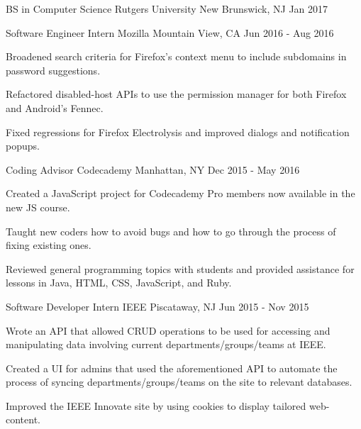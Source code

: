 \documentclass[11pt, a4paper]{awesome-cv}
\begin{document}
\makecvheader

\begin{cventries}
  \cventry
    {BS in Computer Science}
    {Rutgers University}
    {New Brunswick, NJ}
    {Jan 2017}
    {}
\end{cventries}

\vspace{-2mm}

\begin{cventries}
  \cventry
    {Software Engineer Intern}
    {Mozilla}
    {Mountain View, CA}
    {Jun 2016 - Aug 2016}
    {
      \begin{cvitems}
        \item {Broadened search criteria for Firefox’s context menu to include subdomains in password suggestions.}
        \item {Refactored disabled-host APIs to use the permission manager for both Firefox and Android’s Fennec.}
        \item {Fixed regressions for Firefox Electrolysis and improved dialogs and notification popups.}
      \end{cvitems}
    }
  \cventry
    {Coding Advisor}
    {Codecademy}
    {Manhattan, NY}
    {Dec 2015 - May 2016}
    {
      \begin{cvitems}
        \item {Created a JavaScript project for Codecademy Pro members now available in the new JS course.}
        \item {Taught new coders how to avoid bugs and how to go through the process of fixing existing ones.}
        \item {Reviewed general programming topics with students and provided assistance for lessons in Java, HTML, CSS, JavaScript, and Ruby.}
      \end{cvitems}
    }
  \cventry
    {Software Developer Intern}
    {IEEE}
    {Piscataway, NJ}
    {Jun 2015 - Nov 2015}
    {
      \begin{cvitems}
        \item {Wrote an API that allowed CRUD operations to be used for accessing and manipulating data involving current departments/groups/teams at IEEE.}
        \item {Created a UI for admins that used the aforementioned API to automate the process of syncing departments/groups/teams on the site to relevant databases.}
        \item {Improved the IEEE Innovate site by using cookies to display tailored web-content.}

\end{cvitems}}
\end{cventries}
\end{document}
